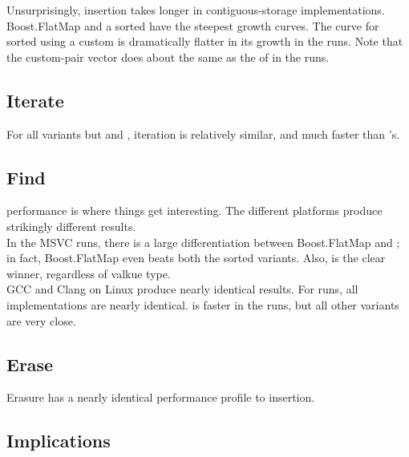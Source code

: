 
Unsurprisingly, insertion takes longer in contiguous-storage implementations.
Boost.FlatMap and a sorted  have the steepest
growth curves.  The curve for sorted  using a custom
 is dramatically flatter in its growth in the 
runs.  Note that the custom-pair vector does about the same as the
 of  in the  runs.

\subsection{Iterate}


For all variants but  and , iteration is
relatively similar, and much faster than 's.

\subsection{Find}


 performance is where things get interesting.  The different
platforms produce strikingly different results.\\

In the MSVC runs, there is a large differentiation between Boost.FlatMap and
; in fact, Boost.FlatMap even beats both the sorted 
variants.  Also,  is the clear winner, regardless of
valkue type.\\

GCC and Clang on Linux produce nearly identical results.  For  runs, all implementations are nearly identical.  
is faster in the  runs, but all other
variants are very close.

\subsection{Erase}


Erasure has a nearly identical performance profile to insertion.\\


\subsection{Implications}

